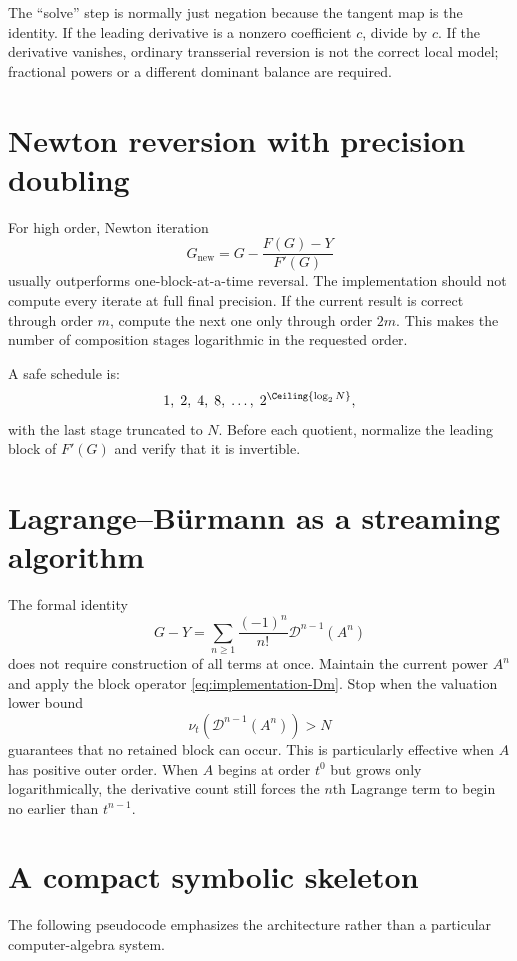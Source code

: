 \documentclass[11pt,oneside]{book}
\theoremstyle{definition}
\theoremstyle{remark}
\newcommand{\D}{\mathcal D}
\begin{document}
The ``solve'' step is normally just negation because the tangent map is the
identity. If the leading derivative is a nonzero coefficient $c$, divide
by $c$. If the derivative vanishes, ordinary transserial reversion is not
the correct local model; fractional powers or a different dominant balance
are required.

\section{Newton reversion with precision doubling}
For high order, Newton iteration
\[
 G_{\mathrm{new}}
 =G-\frac{F(G)-Y}{F'(G)}
\]
usually outperforms one-block-at-a-time reversal. The implementation should
not compute every iterate at full final precision. If the current result is
correct through order $m$, compute the next one only through order $2m$.
This makes the number of composition stages logarithmic in the requested
order.

A safe schedule is:
\[
 1,\;2,\;4,\;8,\;\ldots,\;2^{\Ceiling{\log_2N}},
\]
with the last stage truncated to $N$. Before each quotient, normalize the
leading block of $F'(G)$ and verify that it is invertible.

\section{Lagrange--B\"urmann as a streaming algorithm}
The formal identity
\[
 G-Y=\sum_{n\ge1}\frac{(-1)^n}{n!}\D^{n-1}(A^n)
\]
does not require construction of all terms at once. Maintain the current
power $A^n$ and apply the block operator \eqref{eq:implementation-Dm}. Stop
when the valuation lower bound
\[
 \nu_t\!\left(\D^{n-1}(A^n)\right)>N
\]
guarantees that no retained block can occur. This is particularly effective
when $A$ has positive outer order. When $A$ begins at order $t^0$ but grows
only logarithmically, the derivative count still forces the $n$th Lagrange
term to begin no earlier than $t^{n-1}$.

\section{A compact symbolic skeleton}
The following pseudocode emphasizes the architecture rather than a
particular computer-algebra system.
\end{document}
